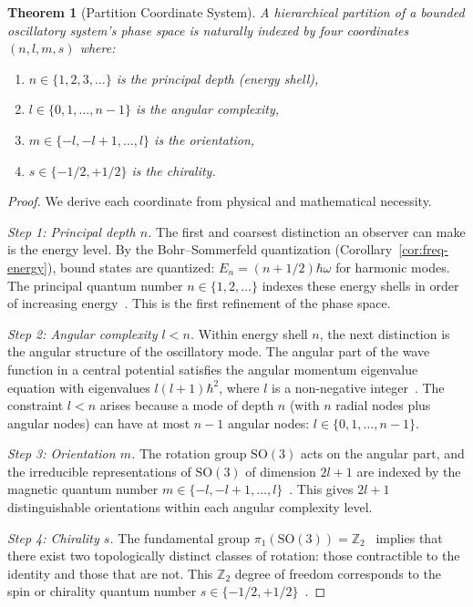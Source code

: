 \documentclass[11pt,twocolumn,a4paper]{article}
\newtheorem{theorem}{Theorem}[section]
\theoremstyle{definition}
\theoremstyle{remark}
\newcommand{\Integer}{\mathbb{Z}}
\begin{document}
\begin{theorem}[Partition Coordinate System]
\label{thm:partition-coords}
A hierarchical partition of a bounded oscillatory system's phase space is naturally indexed by four coordinates $(n, l, m, s)$ where:
\begin{enumerate}[label=(\roman*)]
  \item $n \in \{1, 2, 3, \ldots\}$ is the principal depth (energy shell),
  \item $l \in \{0, 1, \ldots, n-1\}$ is the angular complexity,
  \item $m \in \{-l, -l+1, \ldots, l\}$ is the orientation,
  \item $s \in \{-1/2, +1/2\}$ is the chirality.
\end{enumerate}
\end{theorem}

\begin{proof}
We derive each coordinate from physical and mathematical necessity.

\emph{Step 1: Principal depth $n$.} The first and coarsest distinction an observer can make is the energy level. By the Bohr--Sommerfeld quantization (Corollary~\ref{cor:freq-energy}), bound states are quantized: $E_n = (n + 1/2)\hbar\omega$ for harmonic modes. The principal quantum number $n \in \{1, 2, \ldots\}$ indexes these energy shells in order of increasing energy~\citep{bohr1913}. This is the first refinement of the phase space.

\emph{Step 2: Angular complexity $l < n$.} Within energy shell $n$, the next distinction is the angular structure of the oscillatory mode. The angular part of the wave function in a central potential satisfies the angular momentum eigenvalue equation with eigenvalues $l(l+1)\hbar^2$, where $l$ is a non-negative integer~\citep{griffiths2018}. The constraint $l < n$ arises because a mode of depth $n$ (with $n$ radial nodes plus angular nodes) can have at most $n-1$ angular nodes: $l \in \{0, 1, \ldots, n-1\}$.

\emph{Step 3: Orientation $m$.} The rotation group $\mathrm{SO}(3)$ acts on the angular part, and the irreducible representations of $\mathrm{SO}(3)$ of dimension $2l+1$ are indexed by the magnetic quantum number $m \in \{-l, -l+1, \ldots, l\}$~\citep{wigner1959, hall2015}. This gives $2l+1$ distinguishable orientations within each angular complexity level.

\emph{Step 4: Chirality $s$.} The fundamental group $\pi_1(\mathrm{SO}(3)) = \Integer_2$~\citep{nakahara2003} implies that there exist two topologically distinct classes of rotation: those contractible to the identity and those that are not. This $\Integer_2$ degree of freedom corresponds to the spin or chirality quantum number $s \in \{-1/2, +1/2\}$~\citep{pauli1925}.
\end{proof}
\end{document}
